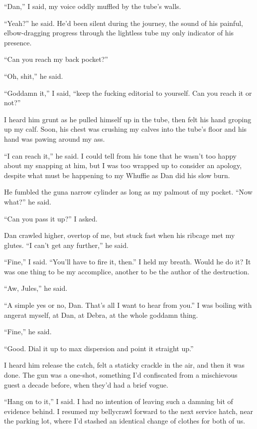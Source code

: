 “Dan,” I said, my voice oddly muffled by the tube's walls.

“Yeah?” he said. He'd been silent during the journey, the sound of
his painful, elbow-dragging progress through the lightless tube my
only indicator of his presence.

“Can you reach my back pocket?”

“Oh, shit,” he said.

“Goddamn it,” I said, “keep the fucking editorial to yourself. Can
you reach it or not?”

I heard him grunt as he pulled himself up in the tube, then felt
his hand groping up my calf. Soon, his chest was crushing my calves
into the tube's floor and his hand was pawing around my ass.

“I can reach it,” he said. I could tell from his tone that he
wasn't too happy about my snapping at him, but I was too wrapped up
to consider an apology, despite what must be happening to my
Whuffie as Dan did his slow burn.

He fumbled the gun{\dash}a narrow cylinder as long as my palm{\dash}out of my
pocket. “Now what?” he said.

“Can you pass it up?” I asked.

Dan crawled higher, overtop of me, but stuck fast when his ribcage
met my glutes. “I can't get any further,” he said.

“Fine,” I said. “You'll have to fire it, then.” I held my breath.
Would he do it? It was one thing to be my accomplice, another to be
the author of the destruction.

“Aw, Jules,” he said.

“A simple yes or no, Dan. That's all I want to hear from you.” I
was boiling with anger{\dash}at myself, at Dan, at Debra, at the whole
goddamn thing.

“Fine,” he said.

“Good. Dial it up to max dispersion and point it straight up.”

I heard him release the catch, felt a staticky crackle in the air,
and then it was done. The gun was a one-shot, something I'd
confiscated from a mischievous guest a decade before, when they'd
had a brief vogue.

“Hang on to it,” I said. I had no intention of leaving such a
damning bit of evidence behind. I resumed my bellycrawl forward to
the next service hatch, near the parking lot, where I'd stashed an
identical change of clothes for both of us.

